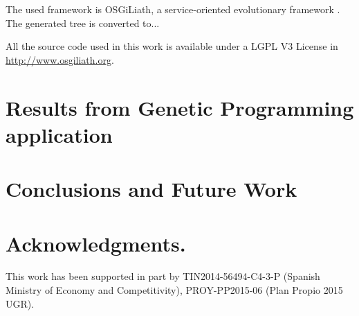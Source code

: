 \documentclass[a4paper,10pt,twocolumn,preprint,3p]{elsarticle}
\begin{document}
The used framework is OSGiLiath, a service-oriented evolutionary
framework \cite{DBLP:journals/soco/Garcia-SanchezGCAG13}. The
generated tree is converted to...

All the source code used in this
work is available under a LGPL V3 License in
\url{http://www.osgiliath.org}. 






\section{Results from Genetic Programming application}
\label{sec:gp}

\section{Conclusions and Future Work}
\label{sec:future}

\section*{Acknowledgments.}

This work has been supported in part by TIN2014-56494-C4-3-P (Spanish
Ministry of Economy and Competitivity), PROY-PP2015-06 (Plan Propio
2015 UGR).



\end{document}
